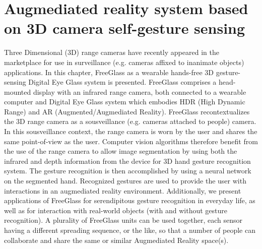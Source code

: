 \chapter{Augmediated reality system based on 3D camera self-gesture sensing}
\label{ar3dgesture}

Three Dimensional (3D) range cameras have recently appeared in the marketplace for use in surveillance
(e.g. cameras affixed to inanimate objects) applications. In this chapter, FreeGlass as a wearable hands-free 3D gesture-sensing Digital Eye Glass system is presented. FreeGlass comprises a head-mounted display with an infrared range camera, both connected to a wearable computer and Digital Eye Glass system which embodies HDR (High Dynamic Range) and AR (Augmented/Augmediated Reality). FreeGlass recontextualizes the 3D range camera as a sousveillance (e.g. cameras attached to people) camera. In this sousveillance context, the range camera is worn by the user and shares the same point-of-view as the user. Computer vision algorithms therefore benefit from the use of the range camera to allow image segmentation by using both the infrared and depth information from the device for 3D hand gesture recognition system. The gesture recognition is then accomplished by using a neural network on the segmented hand. Recognized gestures are used to provide the user with interactions in an augmediated reality environment. Additionally, we present applications of FreeGlass for serendipitous gesture recognition in everyday life, as well as for interaction with real-world objects (with and without gesture recognition). A plurality of FreeGlass units can be used together, each sensor having a different spreading sequence, or the like, so that a number of people can collaborate and share the same or similar Augmediated Reality space(s).

